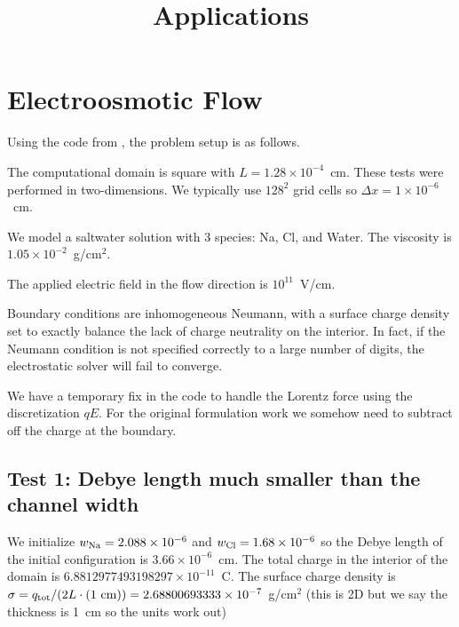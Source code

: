 \documentclass[final]{siamltex}
\begin{document}
\title{Applications}

\maketitle

\section{Electroosmotic Flow}

Using the code from \cite{LowMachElectro}, the problem setup is as follows.

The computational domain is square with $L=1.28\times 10^{-4}$~cm.
These tests were performed in two-dimensions.  We typically use
$128^2$ grid cells so $\Delta x = 1\times 10^{-6}$~cm.

We model a saltwater solution with 3 species: Na, Cl, and Water.
The viscosity is $1.05\times 10^{-2}$~g/cm$^2$.

The applied electric field in the flow direction is $10^{11}$~V/cm.

Boundary conditions are inhomogeneous Neumann, with a surface charge
density set to exactly balance the lack of charge neutrality on the interior.
In fact, if the Neumann condition is not specified correctly to a large number
of digits, the electrostatic solver will fail to converge.

We have a temporary fix in the code to handle the Lorentz force using the
discretization $qE$.  For the original formulation work we somehow need to
subtract off the charge at the boundary.

\subsection{Test 1: Debye length much smaller than the channel width}
We initialize $w_{\rm Na} = 2.088\times 10^{-6}$ and
$w_{\rm Cl} = 1.68\times 10^{-6}$ so the Debye length of the initial
configuration is $3.66\times 10^{-6}$~cm.  The total charge in the interior
of the domain is $6.8812977493198297\times 10^{-11}$~C.  The surface charge density
is $\sigma = q_{\rm tot} / (2L\cdot (1~{\rm cm})) = 2.68800693333\times 10^{-7}$~g/cm$^2$
(this is 2D but we say the thickness is 1~cm so the units work out)
\end{document}

